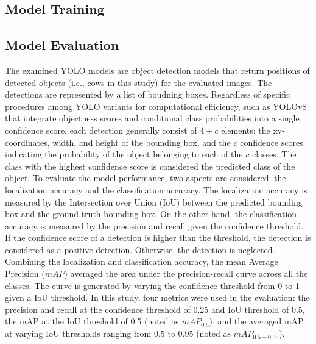 \subsection*{Model Training}



\subsection*{Model Evaluation}

The examined YOLO models are object detection models that return positions of detected objects (i.e., cows in this study) for the evaluated images. The detections are represented by a list of boudning boxes. Regardless of specific procedures among YOLO variants for computational efficiency, such as YOLOv8 that integrate objectness scores and conditional class probabilities into a single confidence score, each detection generally consist of $4+c$ elements: the xy-coordinates, width, and height of the bounding box, and the $c$ confidence scores indicating the probability of the object belonging to each of the $c$ classes. The class with the highest confidence score is considered the predicted class of the object. To evaluate the model performance, two aspects are considered: the localization accuracy and the classification accuracy. The localization accuracy is measured by the Intersection over Union (IoU) between the predicted bounding box and the ground truth bounding box. On the other hand, the classification accuracy is measured by the precision and recall given the confidence threshold. If the confidence score of a detection is higher than the threshold, the detection is considered as a positive detection. Otherwise, the detection is neglected. Combining the localization and classification accuracy, the mean Average Precision ($mAP$) averaged the area under the precision-recall curve across all the classes. The curve is generated by varying the confidence threshold from 0 to 1 given a IoU threshold. In this study, four metrics were used in the evaluation: the precision and recall at the confidence threshold of 0.25 and IoU threshold of 0.5, the mAP at the IoU threshold of 0.5 (noted as $mAP_{0.5}$), and the averaged mAP at varying IoU thresholds ranging from 0.5 to 0.95 (noted as $mAP_{0.5-0.95}$).


